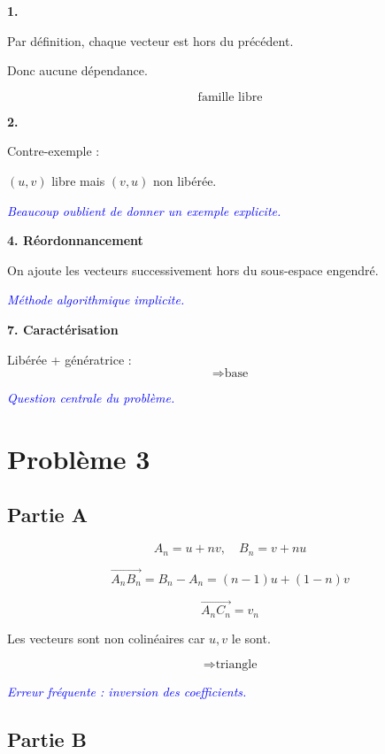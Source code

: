 \documentclass[11pt,a4paper]{article}
\newcommand{\commentaire}[1]{\textcolor{blue}{\textit{#1}}}
\begin{document}

\textbf{1.}

Par définition, chaque vecteur est hors du précédent.

Donc aucune dépendance.

\[
\boxed{\text{famille libre}}
\]


\textbf{2.}

Contre-exemple :

$(u,v)$ libre mais $(v,u)$ non libérée.

\commentaire{Beaucoup oublient de donner un exemple explicite.}


\textbf{4. Réordonnancement}

On ajoute les vecteurs successivement hors du sous-espace engendré.

\commentaire{Méthode algorithmique implicite.}


\textbf{7. Caractérisation}

Libérée + génératrice :
\[
\Rightarrow \text{base}
\]

\commentaire{Question centrale du problème.}

\section*{Problème 3}

\subsection*{Partie A}

\[
A_n=u+nv,\quad B_n=v+nu
\]

\[
\overrightarrow{A_nB_n}=B_n-A_n=(n-1)u+(1-n)v
\]

\[
\overrightarrow{A_nC_n}=v_n
\]

Les vecteurs sont non colinéaires car $u,v$ le sont.

\[
\Rightarrow \text{triangle}
\]

\commentaire{Erreur fréquente : inversion des coefficients.}


\subsection*{Partie B}
\end{document}
